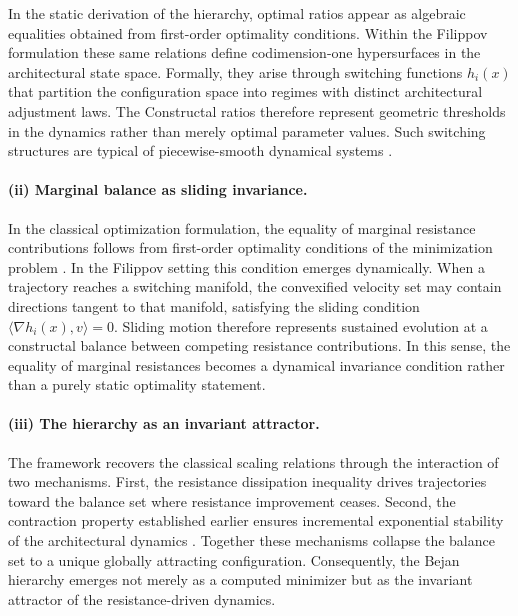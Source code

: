 \documentclass[12pt]{article}
\theoremstyle{plain}
\theoremstyle{definition}
\theoremstyle{remark}
\begin{document}
In the static derivation of the hierarchy,
optimal ratios appear as algebraic equalities obtained from
first-order optimality conditions.
Within the Filippov formulation these same relations define
codimension-one hypersurfaces in the architectural state space.
Formally, they arise through switching functions $h_i(x)$ that
partition the configuration space into regimes with distinct
architectural adjustment laws.
The Constructal ratios therefore represent geometric thresholds in
the dynamics rather than merely optimal parameter values.
Such switching structures are typical of piecewise-smooth dynamical
systems \cite{Filippov1988,diBernardo2008}.

\paragraph{(ii) Marginal balance as sliding invariance.}

In the classical optimization formulation,
the equality of marginal resistance contributions follows from
first-order optimality conditions of the minimization problem
\cite{BejanBadescuDeVos2000AE}.
In the Filippov setting this condition emerges dynamically.
When a trajectory reaches a switching manifold,
the convexified velocity set may contain directions tangent to that
manifold, satisfying the sliding condition
$\langle\nabla h_i(x),v\rangle=0$.
Sliding motion therefore represents sustained evolution at a
constructal balance between competing resistance contributions.
In this sense, the equality of marginal resistances becomes a
dynamical invariance condition rather than a purely static
optimality statement.

\paragraph{(iii) The hierarchy as an invariant attractor.}

The framework recovers the classical scaling relations through the
interaction of two mechanisms.
First, the resistance dissipation inequality drives trajectories
toward the balance set where resistance improvement ceases.
Second, the contraction property established earlier ensures
incremental exponential stability of the architectural dynamics
\cite{LohmillerSlotine1998}.
Together these mechanisms collapse the balance set to a unique
globally attracting configuration.
Consequently, the Bejan hierarchy emerges not merely as a computed
minimizer but as the invariant attractor of the resistance-driven
dynamics.
\end{document}

